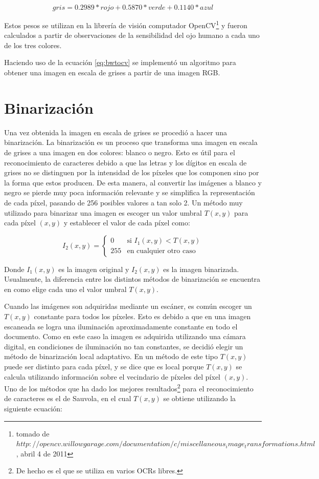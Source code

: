 \documentclass[a4paper, 11pt, oneside]{report}
\begin{document}
\begin{equation}\label{eq:bwtocv}
	gris = 0.2989 * rojo + 0.5870 * verde + 0.1140 * azul 
\end{equation}

Estos pesos se utilizan en la librería de visión computador OpenCV\footnote{tomado de $http://opencv.willowgarage.com/documentation/c/miscellaneous_image_transformations.html$, abril 4 de 2011} y fueron calculados a partir de observaciones de la sensibilidad del ojo humano a cada uno de los tres colores. 

Haciendo uso de la ecuación \ref{eq:bwtocv} se implementó un algoritmo para obtener una imagen en escala de grises a partir de una imagen RGB. 

\section{Binarización}
\label{sect:binarization}

Una vez obtenida la imagen en escala de grises se procedió a hacer una binarización. La binarización es un proceso que transforma una imagen en escala de grises a una imagen en dos colores: blanco o negro. Esto es útil para el reconocimiento de caracteres debido a que las letras y los dígitos en escala de grises no se distinguen por la intensidad de los píxeles que los componen sino por la forma que estos producen. De esta manera, al convertir las imágenes a blanco y negro se pierde muy poca información relevante y se simplifica la representación de cada píxel, pasando de 256 posibles valores a tan solo 2. Un método muy utilizado para binarizar una imagen es escoger un valor umbral $T(x,y)$ para cada píxel $(x,y)$ y establecer el valor de cada píxel como:

\begin{equation}\label{binEq}
	I_2(x,y) = \left\{ \begin{array}{ll}
		0   & \mbox{si $I_1(x,y) < T(x,y)$} \\
		255 & \mbox{en cualquier otro caso}
	\end{array} \right. 
\end{equation}

Donde $I_1(x,y)$ es la imagen original y $I_2(x,y)$ es la imagen binarizada. Usualmente, la diferencia entre los distintos métodos de binarización se encuentra en como elige cada uno el valor umbral $T(x,y)$.

Cuando las imágenes son adquiridas mediante un escáner, es común escoger un $T(x,y)$ constante para todos los píxeles. Esto es debido a que en una imagen escaneada se logra una iluminación aproximadamente constante en todo el documento. Como en este caso la imagen es adquirida utilizando una cámara digital, en condiciones de iluminación no tan constantes, se decidió elegir un método de binarización local adaptativo. En un método de este tipo $T(x,y)$ puede ser distinto para cada píxel, y se dice que es local porque $T(x,y)$ se calcula utilizando información sobre el vecindario de píxeles del píxel $(x,y)$. Uno de los métodos que ha dado los mejores resultados\footnote{De hecho es el que se utiliza en varios OCRs libres.} para el reconocimiento de caracteres es el de Sauvola, en el cual $T(x,y)$ se obtiene utilizando la siguiente ecuación:
\end{document}
